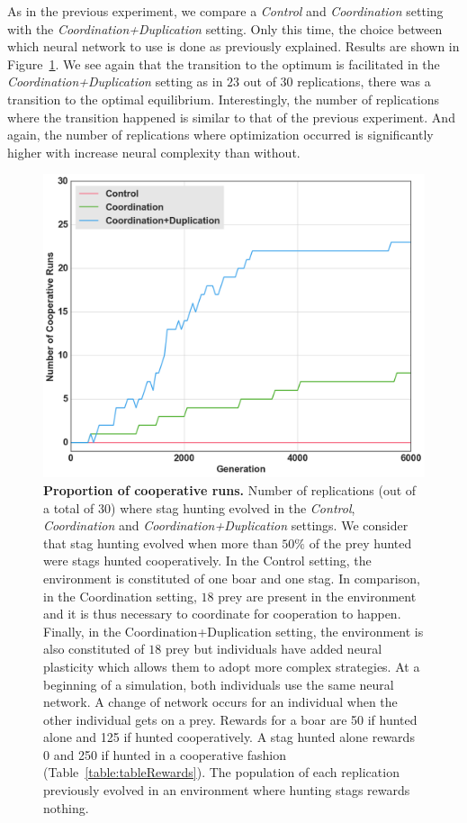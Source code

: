     As in the previous experiment, we compare a \emph{Control} and \emph{Coordination} setting with the \emph{Coordination+Duplication} setting. Only this time, the choice between which neural network to use is done as previously explained. Results are shown in Figure~\ref{fig:figRecyclingComNN}. We see again that the transition to the optimum is facilitated in the \emph{Coordination+Duplication} setting as in $23$ out of $30$ replications, there was a transition to the optimal equilibrium. Interestingly, the number of replications where the transition happened is similar to that of the previous experiment. And again, the number of replications where optimization occurred is significantly higher with increase neural complexity than without.

    \begin{figure}[h]
      \centering
        \includegraphics[width=0.75\linewidth]{fig/ArticleBio2/Fig7.png}
        \caption{\textbf{Proportion of cooperative runs.}
        Number of replications (out of a total of $30$) where stag hunting evolved in the \emph{Control}, \emph{Coordination} and \emph{Coordination+Duplication} settings. We consider that stag hunting evolved when more than $50\%$ of the prey hunted were stags hunted cooperatively. In the Control setting, the environment is constituted of one boar and one stag. In comparison, in the Coordination setting, $18$ prey are present in the environment and it is thus necessary to coordinate for cooperation to happen. Finally, in the Coordination+Duplication setting, the environment is also constituted of $18$ prey but individuals have added neural plasticity which allows them to adopt more complex strategies. At a beginning of a simulation, both individuals use the same neural network. A change of network occurs for an individual when the other individual gets on a prey. Rewards for a boar are 50 if hunted alone and 125 if hunted cooperatively. A stag hunted alone rewards 0 and 250 if hunted in a cooperative fashion (Table~\ref{table:tableRewards}). The population of each replication previously evolved in an environment where hunting stags rewards nothing.}
      \label{fig:figRecyclingComNN}
    \end{figure}

